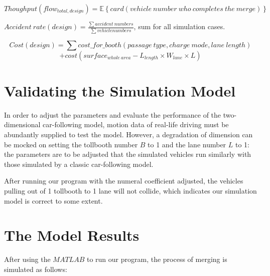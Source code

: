 \documentclass{mcmthesis}
\begin{document}
$$Thoughput(flow_{total, design}) = \mathbb{E} \left\{ card(vehicle\ number\ who\ completes\ the\ merge) \right\} $$

$Accident\ rate(design)= \frac{\sum accident\ numbers}{\sum vehicle numbers}$, sum for all simulation cases.

$$Cost(design)=\sum cost\_for\_booth(passage\ type,charge\ mode,lane\ length)$$
$$+cost(surface_{whole\ area} - L_{length} \times W_{lane} \times L) $$


\section{Validating the Simulation Model}

In order to adjust the parameters and evaluate the performance of the two-dimensional car-following model, motion data of real-life driving must be abundantly supplied to test the model. However, a degradation of dimension can be mocked on setting the tollbooth number $B$ to 1 and the lane number $L$ to 1: the parameters are to be adjusted that the simulated vehicles run similarly with those simulated by a classic car-following model.

After running our program with the numeral coefficient adjusted, the vehicles pulling out of 1 tollbooth to 1 lane will not collide, which indicates our simulation model is correct to some extent.

\section{The Model Results}

After using the $MATLAB$ to run our program, the process of merging is simulated as follows:
\end{document}
